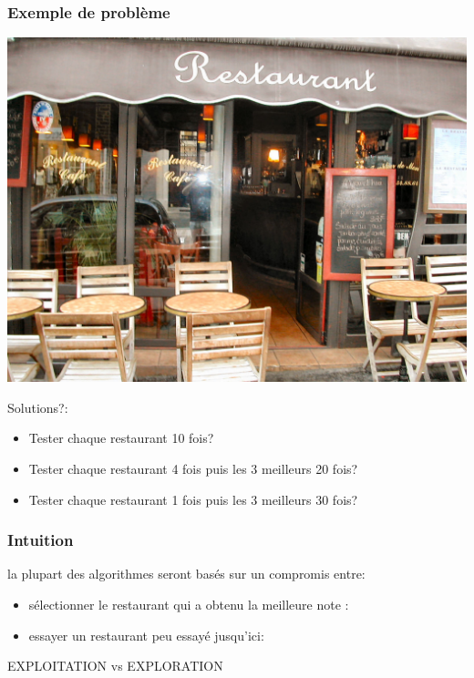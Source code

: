 \documentclass{beamer}
\begin{document}
\begin{frame}
    \frametitle{Exemple de problème}
    \begin{center}
        \includegraphics[scale=0.05]{restau.jpg}
    \end{center}
    Solutions?:
    \begin{itemize}
        \item Tester chaque restaurant 10 fois?
        \item Tester chaque restaurant 4 fois puis les 3 meilleurs 20 fois?
        \item Tester chaque restaurant 1 fois puis les 3 meilleurs 30 fois?
    \end{itemize}
\end{frame}

\begin{frame}
    \frametitle{Intuition}
    la plupart des algorithmes seront basés sur un compromis entre:
    \begin{itemize}
        \item sélectionner le restaurant qui a obtenu la meilleure note  :
        \item essayer un restaurant peu essayé jusqu'ici:
    \end{itemize}

    \begin{center}
        {\color{red}EXPLOITATION} vs {\color{green}EXPLORATION}
    \end{center}

\end{frame}
\end{document}
